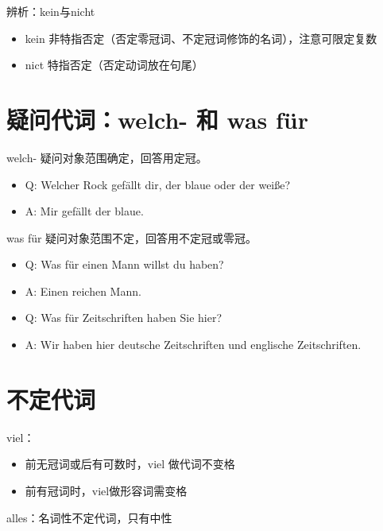 辨析：kein与nicht
\begin{itemize}
    \label{sec:pron:kein}
    \item kein 非特指否定（否定零冠词、不定冠词修饰的名词），注意可限定复数
    \item nict 特指否定（否定动词放在句尾）
\end{itemize}
\restoregeometry

\section{疑问代词：welch- 和 was für}
welch- 疑问对象范围确定，回答用定冠。
\begin{itemize}
    \item Q: Welcher Rock gefällt dir, der blaue oder der weiße?
    \item A: Mir gefällt der blaue.
\end{itemize}
was für 疑问对象范围不定，回答用不定冠或零冠。
\begin{itemize}
    \item Q: Was für einen Mann willst du haben?
    \item A: Einen reichen Mann.
    \item Q: Was für Zeitschriften haben Sie hier?
    \item A: Wir haben hier deutsche Zeitschriften und englische Zeitschriften.
\end{itemize}

\section{不定代词}
viel：
\begin{itemize}
    \item 前无冠词或后有可数时，viel 做代词不变格
    \item 前有冠词时，viel做形容词需变格
\end{itemize}
alles：名词性不定代词，只有中性